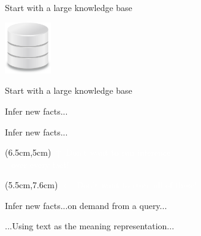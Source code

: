 \begin{frame}{Start with a large knowledge base}
\begin{center}
  \hspace{0.8cm}
  \includegraphics[height=2.2cm]{../img/database.png}
\end{center}
\end{frame}

\begin{frame}[noframenumbering]{Start with a large knowledge base}
\begin{center}
  \teaserManyPremises
\end{center}
\end{frame}

\begin{frame}[noframenumbering]{Infer new facts...}
\begin{center}
  \teaserBlindInferenceNaturalOrderBlind
\end{center}
\end{frame}

\begin{frame}[noframenumbering]{Infer new facts...}
\begin{center}
  \teaserBlindInferenceNaturalOrder
\end{center}
\pause
\begin{textblock*}{6.0cm}(6.5cm,5cm)
  \textcolor<1-1>{white}{$\uparrow$ Don't want to run inference \\ $~~$ over every fact!}
\end{textblock*}
\pause
\begin{textblock*}{6cm}(5.5cm,7.6cm)
  \textcolor<1-2>{white}{$\leftarrow$ Don't want to store all of these!}
\end{textblock*}
\end{frame}

\begin{frame}[noframenumbering]{Infer new facts...on demand from a query...}
\begin{center}
  \teaserBlindInference
\end{center}
\end{frame}

\begin{frame}[noframenumbering]{...Using text as the meaning representation...}
\begin{center}
  \teaserInference
\end{center}
\end{frame}

